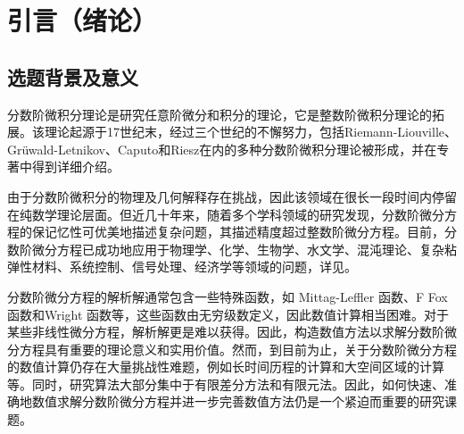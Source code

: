 \chapter[引言（绪论）]{引言（绪论）}
\section{选题背景及意义}
分数阶微积分理论是研究任意阶微分和积分的理论，它是整数阶微积分理论的拓展。该理论起源于17世纪末，经过三个世纪的不懈努力，包括Riemann-Liouville、Grüwald-Letnikov、Caputo和Riesz在内的多种分数阶微积分理论被形成，并在专著\cite{samkoFractionalIntegralsDerivatives1993}中得到详细介绍。

由于分数阶微积分的物理及几何解释存在挑战，因此该领域在很长一段时间内停留在纯数学理论层面。但近几十年来，随着多个学科领域的研究发现，分数阶微分方程的保记忆性可优美地描述复杂问题，其描述精度超过整数阶微分方程。目前，分数阶微分方程已成功地应用于物理学、化学、生物学、水文学、混沌理论、复杂粘弹性材料、系统控制、信号处理、经济学等领域的问题，详见\cite{liIntroductionFractionalCalculus2015,HandbookDifferentialEquations2008,brychkovIndefiniteIntegrals2008,zhangMassBalanceBased2005,carrerasAnomalousDiffusionExit2001,hilferFRACTIONALCALCULUSREGULAR2000,liangRobustnessFractionalorderBoundary2007,maginSolvingFractionalOrder2009,zaslavskySelfsimilarTransportIncomplete1993,sunRandomorderFractionalDifferential2011}。

分数阶微分方程的解析解通常包含一些特殊函数，如 Mittag-Leffler 函数、F Fox 函数和Wright 函数等，这些函数由无穷级数定义，因此数值计算相当困难。对于某些非线性微分方程，解析解更是难以获得。因此，构造数值方法以求解分数阶微分方程具有重要的理论意义和实用价值。然而，到目前为止，关于分数阶微分方程的数值计算仍存在大量挑战性难题，例如长时间历程的计算和大空间区域的计算等。同时，研究算法大部分集中于有限差分方法和有限元法。因此，如何快速、准确地数值求解分数阶微分方程并进一步完善数值方法仍是一个紧迫而重要的研究课题。

